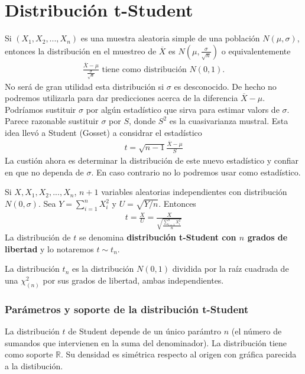 \section{Distribución t-Student}
Si $(X_1,X_2,...,X_n)$ es una muestra aleatoria simple de una población $N(\mu,\sigma)$, entonces la distribución en el muestreo de $\overline{X}$ es $N\left( \mu, \frac{\sigma}{\sqrt{n}} \right)$ o equivalentemente
\begin{align*}
    \frac{\overline{X} - \mu}{\frac{\sigma}{\sqrt{n}}} \text{ tiene como distribución } N(0,1).
\end{align*}
No será de gran utilidad esta distribución si $\sigma$ es desconocido. De hecho no podremos utilizarla para dar predicciones acerca de la diferencia $\overline{X} - \mu$. Podríamos sustituir $\sigma$ por algún estadístico que sirva para estimar valors de $\sigma$. Parece razonable sustituir $\sigma$ por $S$, donde $S^2$ es la cuasivarianza mustral. Esta idea llevó a Student (Gosset) a considrar el estadístico
\begin{align*}
    t = \sqrt{n -1}\frac{\overline{X} - \mu}{S}
\end{align*}
La custión ahora es determinar la distribución de este nuevo estadístico y confiar en que no dependa de $\sigma$. En caso contrario no lo podremos usar como estadístico.
\begin{defi}
    Si $X,X_1,X_2,...,X_n$, $n +1$ variables aleatorias independientes con distribución $N(0,\sigma)$. Sea $Y = \sum_{i=1}^{n}{X_i^2}$ y $U = \sqrt{Y/n}$. Entonces
    \begin{align*}
        t = \frac{X}{U} = \frac{X}{\sqrt{\frac{\sum_{i=1}^{n}{X_i^2}}{n}}}
    \end{align*}
    La distribución de $t$ se denomina \textbf{distribución t-Student con $n$ grados de libertad} y lo notaremos $t \sim t_n$.
\end{defi}
La distribución $t_n$ es la distribución $N(0,1)$ dividida por la raíz cuadrada de una $\chi_{(n)}^2$ por sus grados de libertad, ambas independientes.

\subsubsection{Parámetros y soporte de la distribución t-Student}
La distribución $t$ de Student depende de un único parámtro $n$ (el número de sumandos que intervienen en la suma del denominador). La distribución tiene como soporte $\mathbb{R}$. Su densidad es simétrica respecto al origen con gráfica parecida a la distibución.

